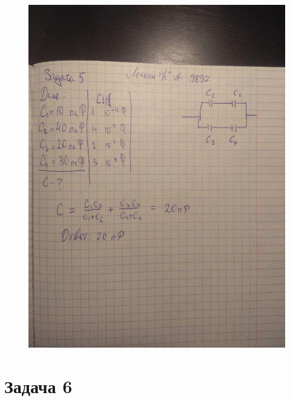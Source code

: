 \documentclass[12pt,a4paper]{article}  %
\begin{document}
	\begin{figure}[hpt!]
		\centering
		\includegraphics[width=1\linewidth]{photo/task5_solution}
	\end{figure}
	
	\section*{Задача 6}
	
\end{document}
